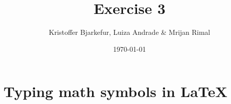 \documentclass{article}                 %
\title{Exercise 3} 	%
\author{Kristoffer Bjarkefur, Luiza Andrade \& Mrijan Rimal}
\date{\today}                    							%
\begin{document}

\maketitle
\newpage

\section*{Typing math symbols in {\LaTeX}}
\end{document}
